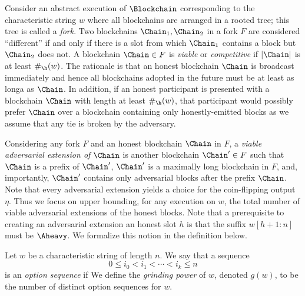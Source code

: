 Consider an abstract execution of $\Blockchain$ 
corresponding to the characteristic string $w$ 
where 
all blockchains are arranged in a rooted tree; 
this tree is called a \emph{fork}. 
Two blockchains $\Chain_1, \Chain_2$ in a fork $F$ are considered ``different'' 
if and only if there is a slot from which 
$\Chain_1$ contains a block but $\Chain_2$ does not. 
A blockchain $\Chain \in F$ is \emph{viable} or \emph{competitive} 
if $\vert \Chain \vert$ is at least $\#_\h(w)$. 
The rationale is that an honest blockchain $\Chain$ is broadcast immediately 
and hence all blockchains adopted in the future 
must be at least as longa as $\Chain$. 
In addition, if an honest participant is presented with 
a blockchain $\Chain$ with length at least $\#_\h(w)$, 
that participant would possibly prefer $\Chain$ 
over a blockchain containing only honestly-emitted blocks 
as we assume that any tie is broken by the adversary. 

Considering any fork $F$ and an honest blockchain $\Chain$ in $F$, 
a \emph{viable adversarial extension of $\Chain$} 
is another blockchain $\Chain' \in F$ 
such that $\Chain$ is a prefix of $\Chain'$, 
$\Chain'$ is a maximally long blockchain in $F$, 
and, importantly, $\Chain'$ contains only adversarial blocks after the prefix $\Chain$. 
Note that every adversarial extension yields a choice 
for the coin-flipping output $\eta$.
Thus we focus on upper bounding, 
for any execution on $w$, 
the total number of viable adversarial extensions 
of the honest blocks.
Note that a prerequisite to creating an adversarial extension 
an honest slot $h$ is that 
the suffix $w[h + 1 : n]$ must be $\Aheavy$.
We formalize this notion in the definition below.

\begin{definition}\label{def:option-sequence}
  Let $w$ be a characteristic string of length $n$. 
  We say that a sequence
  \[
    0 \leq i_0 < i_1 < \cdots < i_k \leq n
  \]
  is an \emph{option sequence} if
  We define the \emph{grinding power} of $w$, denoted $g(w)$, to be the
  number of distinct option sequences for $w$.
\end{definition}


